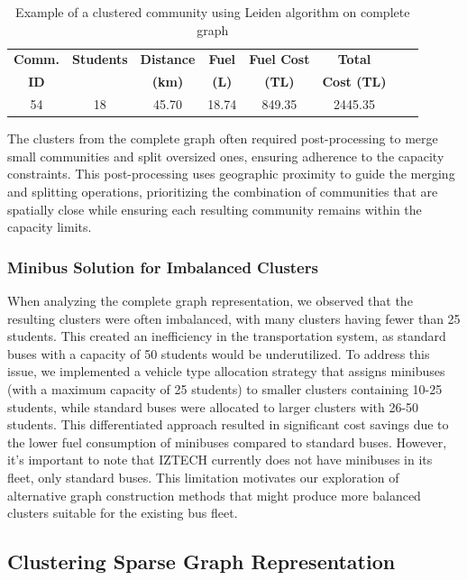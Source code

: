 \begin{table}[h]
\centering

\label{tab:leiden_complete_example}
\begin{tabular}{|c|c|c|c|c|c|c|c|}
\hline
\textbf{Comm.} & \textbf{Students}  &  \textbf{Distance} & \textbf{Fuel} & \textbf{Fuel Cost} & \textbf{Total} \\
\textbf{ID} & & \textbf{(km)} & \textbf{(L)} & \textbf{(TL)} & \textbf{Cost (TL)} \\
\hline
54 & 18  & 45.70 & 18.74 & 849.35 & 2445.35 \\
\hline
\end{tabular}
\caption{Example of a clustered community using Leiden algorithm on complete graph}
\end{table}

The clusters from the complete graph often required post-processing to merge small communities and split oversized ones, ensuring adherence to the capacity constraints. This post-processing uses geographic proximity to guide the merging and splitting operations, prioritizing the combination of communities that are spatially close while ensuring each resulting community remains within the capacity limits.

\subsubsection{Minibus Solution for Imbalanced Clusters}
\label{subsubsec:minibus_solution}

When analyzing the complete graph representation, we observed that the resulting clusters were often imbalanced, with many clusters having fewer than 25 students. This created an inefficiency in the transportation system, as standard buses with a capacity of 50 students would be underutilized. To address this issue, we implemented a vehicle type allocation strategy that assigns minibuses (with a maximum capacity of 25 students) to smaller clusters containing 10-25 students, while standard buses were allocated to larger clusters with 26-50 students. This differentiated approach resulted in significant cost savings due to the lower fuel consumption of minibuses compared to standard buses. However, it's important to note that IZTECH currently does not have minibuses in its fleet, only standard buses. This limitation motivates our exploration of alternative graph construction methods that might produce more balanced clusters suitable for the existing bus fleet.

\subsection{Clustering Sparse Graph Representation}
\label{subsec:clustering_sparse}

